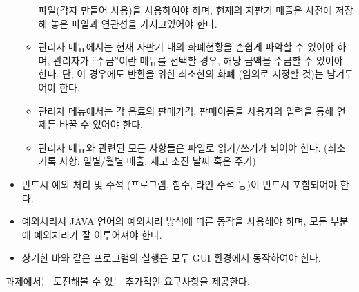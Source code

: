 \documentclass{oblivoir}
\begin{document}
\begin{itemize}
\begin{itemize}
            파일(각자 만들어 사용)을 사용하여야 하며,
            현재의 자판기 매출은 사전에 저장해 놓은 파일과
            연관성을 가지고있어야 한다.
            \item 관리자 메뉴에서는 현재 자판기 내의 화폐현황을
            손쉽게 파악할 수 있어야 하며,
            관리자가 “수금”이란 메뉴를 선택할 경우,
            해당 금액을 수금할 수 있어야 한다.
            단, 이 경우에도 반환을 위한 최소한의 화폐
            (임의로 지정할 것)는 남겨두어야 한다.
            \item 관리자 메뉴에서는 각 음료의 판매가격,
            판매이름을 사용자의 입력을 통해 언제든 바꿀 수 있어야 한다.
            \item 관리자 메뉴와 관련된 모든 사항들은 파일로
            읽기/쓰기가 되어야 한다.
            (최소 기록 사항: 일별/월별 매출, 재고 소진 날짜 혹은 주기)
        \end{itemize}
        \item 반드시 예외 처리 및 주석 (프로그램, 함수, 라인 주석 등)이
        반드시 포함되어야 한다.
        \item 예외처리시 JAVA 언어의 예외처리 방식에 따른 동작을 사용해야 하며,
        모든 부분에 예외처리가 잘 이루어져야 한다.
        \item 상기한 바와 같은 프로그램의 실행은 모두 GUI 환경에서 동작하여야 한다.
    \end{itemize}

    과제에서는 도전해볼 수 있는 추가적인 요구사항을 제공한다.
\end{document}
